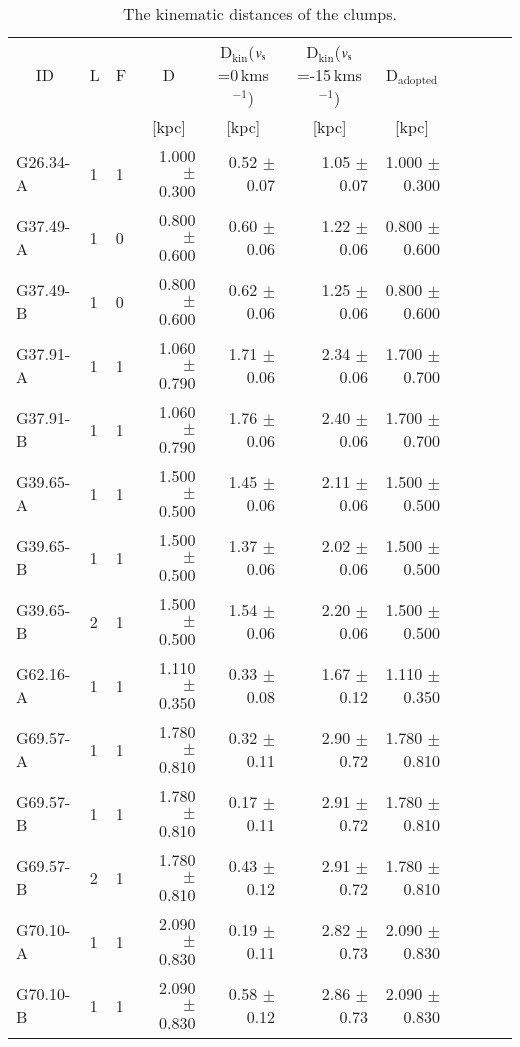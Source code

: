 \documentclass[printer]{aa}
\begin{document}
\begin{table*}[t]
	\centering
	\footnotesize
    	\caption{The kinematic distances of the clumps.}
		\begin{tabular}{l l l r r r r r r r r}
		\hline
\multicolumn{1}{c}{ID} & \multicolumn{1}{c}{L} & \multicolumn{1}{c}{F} & \multicolumn{1}{c}{D} & \multicolumn{1}{c}{D$\mathrm{_{kin}}$($v_{\rm s}$=0\,kms$^{-1}$)} & \multicolumn{1}{c}{D$\mathrm{_{kin}}$($v_{\rm s}$=-15\,kms$^{-1}$)} & \multicolumn{1}{c}{D$\mathrm{_{adopted}}$} \\
 & & & \multicolumn{1}{c}{[kpc]} & \multicolumn{1}{c}{[kpc]} & \multicolumn{1}{c}{[kpc]} & \multicolumn{1}{c}{[kpc]}\\
		\hline
		\hline
G26.34-A & 1 & 1 & 1.000 $\pm$ 0.300 & 0.52 $\pm$ 0.07 & 1.05 $\pm$ 0.07 & 1.000 $\pm$ 0.300 \\
G37.49-A & 1 & 0 & 0.800 $\pm$ 0.600 & 0.60 $\pm$ 0.06 & 1.22 $\pm$ 0.06 & 0.800 $\pm$ 0.600 \\
G37.49-B & 1 & 0 & 0.800 $\pm$ 0.600 & 0.62 $\pm$ 0.06 & 1.25 $\pm$ 0.06 & 0.800 $\pm$ 0.600 \\
G37.91-A & 1 & 1 & 1.060 $\pm$ 0.790 & 1.71 $\pm$ 0.06 & 2.34 $\pm$ 0.06 & 1.700 $\pm$ 0.700 \\
G37.91-B & 1 & 1 & 1.060 $\pm$ 0.790 & 1.76 $\pm$ 0.06 & 2.40 $\pm$ 0.06 & 1.700 $\pm$ 0.700 \\
G39.65-A & 1 & 1 & 1.500 $\pm$ 0.500 & 1.45 $\pm$ 0.06 & 2.11 $\pm$ 0.06 & 1.500 $\pm$ 0.500 \\
G39.65-B & 1 & 1 & 1.500 $\pm$ 0.500 & 1.37 $\pm$ 0.06 & 2.02 $\pm$ 0.06 & 1.500 $\pm$ 0.500 \\
G39.65-B & 2 & 1 & 1.500 $\pm$ 0.500 & 1.54 $\pm$ 0.06 & 2.20 $\pm$ 0.06 & 1.500 $\pm$ 0.500 \\
G62.16-A & 1 & 1 & 1.110 $\pm$ 0.350 & 0.33 $\pm$ 0.08 & 1.67 $\pm$ 0.12 & 1.110 $\pm$ 0.350 \\
G69.57-A & 1 & 1 & 1.780 $\pm$ 0.810 & 0.32 $\pm$ 0.11 & 2.90 $\pm$ 0.72 & 1.780 $\pm$ 0.810 \\
G69.57-B & 1 & 1 & 1.780 $\pm$ 0.810 & 0.17 $\pm$ 0.11 & 2.91 $\pm$ 0.72 & 1.780 $\pm$ 0.810 \\
G69.57-B & 2 & 1 & 1.780 $\pm$ 0.810 & 0.43 $\pm$ 0.12 & 2.91 $\pm$ 0.72 & 1.780 $\pm$ 0.810 \\
G70.10-A & 1 & 1 & 2.090 $\pm$ 0.830 & 0.19 $\pm$ 0.11 & 2.82 $\pm$ 0.73 & 2.090 $\pm$ 0.830 \\
G70.10-B & 1 & 1 & 2.090 $\pm$ 0.830 & 0.58 $\pm$ 0.12 & 2.86 $\pm$ 0.73 & 2.090 $\pm$ 0.830 \\

\end{tabular}
\end{table*}
\end{document}
